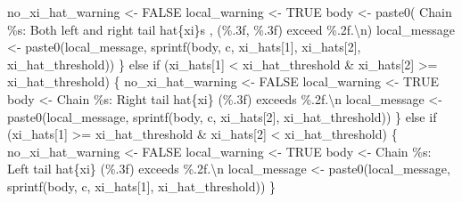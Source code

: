 \documentclass[
  letterpaper,
  DIV=11,
  numbers=noendperiod]{scrartcl}
\newenvironment{Shaded}{\begin{snugshade}}{\end{snugshade}}
\newcommand{\CharTok}[1]{\textcolor[rgb]{0.13,0.47,0.30}{#1}}
\newcommand{\ControlFlowTok}[1]{\textcolor[rgb]{0.00,0.23,0.31}{#1}}
\newcommand{\DecValTok}[1]{\textcolor[rgb]{0.68,0.00,0.00}{#1}}
\newcommand{\NormalTok}[1]{\textcolor[rgb]{0.00,0.23,0.31}{#1}}
\newcommand{\OperatorTok}[1]{\textcolor[rgb]{0.37,0.37,0.37}{#1}}
\newcommand{\SpecialCharTok}[1]{\textcolor[rgb]{0.37,0.37,0.37}{#1}}
\newcommand{\StringTok}[1]{\textcolor[rgb]{0.13,0.47,0.30}{#1}}
\begin{document}
\begin{Shaded}
\begin{Highlighting}[]
\NormalTok{        no\_xi\_hat\_warning }\OperatorTok{\textless{}{-}}\NormalTok{ FALSE}
\NormalTok{        local\_warning }\OperatorTok{\textless{}{-}}\NormalTok{ TRUE}
\NormalTok{        body }\OperatorTok{\textless{}{-}}\NormalTok{ paste0(}\StringTok{\textquotesingle{}  Chain }\SpecialCharTok{\%s}\StringTok{: Both left and right tail hat}\SpecialCharTok{\{xi\}}\StringTok{s \textquotesingle{}}\NormalTok{,}
                       \StringTok{\textquotesingle{}(}\SpecialCharTok{\%.3f}\StringTok{, }\SpecialCharTok{\%.3f}\StringTok{) exceed }\SpecialCharTok{\%.2f}\StringTok{.}\CharTok{\textbackslash{}n}\StringTok{\textquotesingle{}}\NormalTok{)}
\NormalTok{        local\_message }\OperatorTok{\textless{}{-}}\NormalTok{ paste0(local\_message,}
\NormalTok{                                sprintf(body, c,}
\NormalTok{                                        xi\_hats[}\DecValTok{1}\NormalTok{], xi\_hats[}\DecValTok{2}\NormalTok{],}
\NormalTok{                                        xi\_hat\_threshold))}
\NormalTok{      \} }\ControlFlowTok{else} \ControlFlowTok{if}\NormalTok{ (xi\_hats[}\DecValTok{1}\NormalTok{] }\OperatorTok{\textless{}}\NormalTok{ xi\_hat\_threshold }\OperatorTok{\&} 
\NormalTok{                 xi\_hats[}\DecValTok{2}\NormalTok{] }\OperatorTok{\textgreater{}=}\NormalTok{ xi\_hat\_threshold) \{}
\NormalTok{        no\_xi\_hat\_warning }\OperatorTok{\textless{}{-}}\NormalTok{ FALSE}
\NormalTok{        local\_warning }\OperatorTok{\textless{}{-}}\NormalTok{ TRUE}
\NormalTok{        body }\OperatorTok{\textless{}{-}} \StringTok{\textquotesingle{}  Chain }\SpecialCharTok{\%s}\StringTok{: Right tail hat}\SpecialCharTok{\{xi\}}\StringTok{ (}\SpecialCharTok{\%.3f}\StringTok{) exceeds }\SpecialCharTok{\%.2f}\StringTok{.}\CharTok{\textbackslash{}n}\StringTok{\textquotesingle{}}
\NormalTok{        local\_message }\OperatorTok{\textless{}{-}}\NormalTok{ paste0(local\_message,}
\NormalTok{                                sprintf(body, c,}
\NormalTok{                                        xi\_hats[}\DecValTok{2}\NormalTok{],}
\NormalTok{                                        xi\_hat\_threshold))}
\NormalTok{      \} }\ControlFlowTok{else} \ControlFlowTok{if}\NormalTok{ (xi\_hats[}\DecValTok{1}\NormalTok{] }\OperatorTok{\textgreater{}=}\NormalTok{ xi\_hat\_threshold }\OperatorTok{\&} 
\NormalTok{                 xi\_hats[}\DecValTok{2}\NormalTok{] }\OperatorTok{\textless{}}\NormalTok{ xi\_hat\_threshold) \{}
\NormalTok{        no\_xi\_hat\_warning }\OperatorTok{\textless{}{-}}\NormalTok{ FALSE}
\NormalTok{        local\_warning }\OperatorTok{\textless{}{-}}\NormalTok{ TRUE}
\NormalTok{        body }\OperatorTok{\textless{}{-}} \StringTok{\textquotesingle{}  Chain }\SpecialCharTok{\%s}\StringTok{: Left tail hat}\SpecialCharTok{\{xi\}}\StringTok{ (}\SpecialCharTok{\%.3f}\StringTok{) exceeds }\SpecialCharTok{\%.2f}\StringTok{.}\CharTok{\textbackslash{}n}\StringTok{\textquotesingle{}}
\NormalTok{        local\_message }\OperatorTok{\textless{}{-}}\NormalTok{ paste0(local\_message,}
\NormalTok{                                sprintf(body, c,}
\NormalTok{                                        xi\_hats[}\DecValTok{1}\NormalTok{],}
\NormalTok{                                        xi\_hat\_threshold))}
\NormalTok{      \}}
      

\end{Highlighting}
\end{Shaded}
\end{document}
